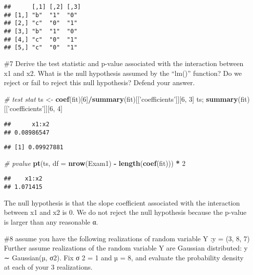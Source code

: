 \documentclass[
]{article}
\newenvironment{Shaded}{\begin{snugshade}}{\end{snugshade}}
\newcommand{\CommentTok}[1]{\textcolor[rgb]{0.56,0.35,0.01}{\textit{#1}}}
\newcommand{\DataTypeTok}[1]{\textcolor[rgb]{0.13,0.29,0.53}{#1}}
\newcommand{\DecValTok}[1]{\textcolor[rgb]{0.00,0.00,0.81}{#1}}
\newcommand{\KeywordTok}[1]{\textcolor[rgb]{0.13,0.29,0.53}{\textbf{#1}}}
\newcommand{\NormalTok}[1]{#1}
\newcommand{\OperatorTok}[1]{\textcolor[rgb]{0.81,0.36,0.00}{\textbf{#1}}}
\newcommand{\StringTok}[1]{\textcolor[rgb]{0.31,0.60,0.02}{#1}}
\begin{document}
\begin{verbatim}
##      [,1] [,2] [,3]
## [1,] "b"  "1"  "0" 
## [2,] "c"  "0"  "1" 
## [3,] "b"  "1"  "0" 
## [4,] "c"  "0"  "1" 
## [5,] "c"  "0"  "1"
\end{verbatim}

\#7 Derive the test statistic and p-value associated with the
interaction between x1 and x2. What is the null hypothesis assumed by
the ``lm()'' function? Do we reject or fail to reject this null
hypothesis? Defend your answer.

\begin{Shaded}
\begin{Highlighting}[]
\CommentTok{# test stat}
\NormalTok{ts <-}\StringTok{ }\KeywordTok{coef}\NormalTok{(fit)[}\DecValTok{6}\NormalTok{]}\OperatorTok{/}\KeywordTok{summary}\NormalTok{(fit)[[}\StringTok{'coefficients'}\NormalTok{]][}\DecValTok{6}\NormalTok{, }\DecValTok{3}\NormalTok{]}
\NormalTok{ts; }\KeywordTok{summary}\NormalTok{(fit)[[}\StringTok{'coefficients'}\NormalTok{]][}\DecValTok{6}\NormalTok{, }\DecValTok{4}\NormalTok{]}
\end{Highlighting}
\end{Shaded}

\begin{verbatim}
##      x1:x2 
## 0.08986547
\end{verbatim}

\begin{verbatim}
## [1] 0.09927881
\end{verbatim}

\begin{Shaded}
\begin{Highlighting}[]
\CommentTok{# pvalue}
\KeywordTok{pt}\NormalTok{(ts, }\DataTypeTok{df =} \KeywordTok{nrow}\NormalTok{(Exam1) }\OperatorTok{-}\StringTok{ }\KeywordTok{length}\NormalTok{(}\KeywordTok{coef}\NormalTok{(fit))) }\OperatorTok{*}\StringTok{ }\DecValTok{2}
\end{Highlighting}
\end{Shaded}

\begin{verbatim}
##    x1:x2 
## 1.071415
\end{verbatim}

The null hypothesis is that the slope coefficient associated with the
interaction between x1 and x2 is 0. We do not reject the null hypothesis
because the p-value is larger than any reasonable α.

\#8 assume you have the following realizations of random variable Y :y =
(3, 8, 7) Further assume realizations of the random variable Y are
Gaussian distributed: y ∼ Gaussian(µ, σ2). Fix σ 2 = 1 and µ = 8, and
evaluate the probability density at each of your 3 realizations.
\end{document}

